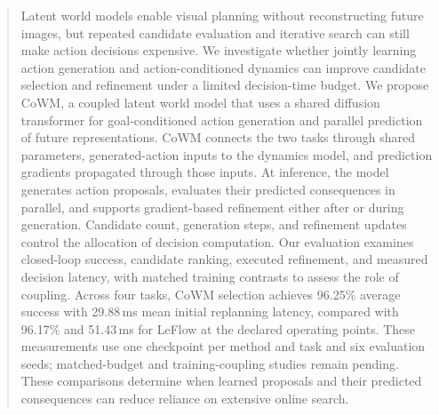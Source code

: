 \begin{abstract}
Latent world models enable visual planning without reconstructing future images, but repeated candidate evaluation and iterative search can still make action decisions expensive. We investigate whether jointly learning action generation and action-conditioned dynamics can improve candidate selection and refinement under a limited decision-time budget. We propose CoWM, a coupled latent world model that uses a shared diffusion transformer for goal-conditioned action generation and parallel prediction of future representations. CoWM connects the two tasks through shared parameters, generated-action inputs to the dynamics model, and prediction gradients propagated through those inputs. At inference, the model generates action proposals, evaluates their predicted consequences in parallel, and supports gradient-based refinement either after or during generation. Candidate count, generation steps, and refinement updates control the allocation of decision computation. Our evaluation examines closed-loop success, candidate ranking, executed refinement, and measured decision latency, with matched training contrasts to assess the role of coupling. Across four tasks, CoWM selection achieves 96.25\% average success with 29.88\,ms mean initial replanning latency, compared with 96.17\% and 51.43\,ms for LeFlow at the declared operating points. These measurements use one checkpoint per method and task and six evaluation seeds; matched-budget and training-coupling studies remain pending. These comparisons determine when learned proposals and their predicted consequences can reduce reliance on extensive online search.
\end{abstract}
